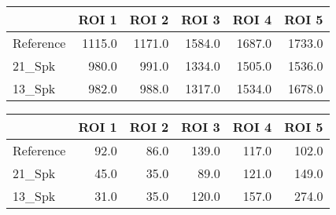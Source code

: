 \begin{tabular}{lrrrrr}
\toprule
{} &   ROI 1 &   ROI 2 &   ROI 3 &   ROI 4 &   ROI 5 \\
\midrule
Reference &  1115.0 &  1171.0 &  1584.0 &  1687.0 &  1733.0 \\
21\_Spk    &   980.0 &   991.0 &  1334.0 &  1505.0 &  1536.0 \\
13\_Spk    &   982.0 &   988.0 &  1317.0 &  1534.0 &  1678.0 \\
\bottomrule
\end{tabular}
\begin{tabular}{lrrrrr}
\toprule
{} &  ROI 1 &  ROI 2 &  ROI 3 &  ROI 4 &  ROI 5 \\
\midrule
Reference &   92.0 &   86.0 &  139.0 &  117.0 &  102.0 \\
21\_Spk    &   45.0 &   35.0 &   89.0 &  121.0 &  149.0 \\
13\_Spk    &   31.0 &   35.0 &  120.0 &  157.0 &  274.0 \\
\bottomrule
\end{tabular}
